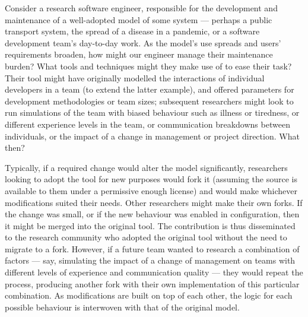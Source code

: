 







Consider a research software engineer, responsible for the development and
maintenance of a well-adopted model of some \sociotechnical system --- perhaps a
public transport system, the spread of a disease in a pandemic, or a software
development team's day-to-day work. As the model's use spreads and users'
requirements broaden, how might our engineer manage their maintenance burden?
What tools and techniques might they make use of to ease their task? Their tool
might have originally modelled the interactions of individual developers in a
team (to extend the latter example), and offered parameters for development
methodologies or team sizes; subsequent researchers might look to run
simulations of the team with biased behaviour such as illness or tiredness, or
different experience levels in the team, or communication breakdowns between
individuals, or the impact of a change in management or project direction. What
then?

Typically, if a required change would alter the model significantly, researchers
looking to adopt the tool for new purposes would fork it (assuming the source is
available to them under a permissive enough license) and would make whichever
modifications suited their needs. Other researchers might make their own forks.
If the change was small, or if the new behaviour was enabled in configuration,
then it might be merged into the original tool. The contribution is thus
disseminated to the research community who adopted the original tool without the
need to migrate to a fork. However, if a future team wanted to research a
combination of factors --- say, simulating the impact of a change of management
on teams with different levels of experience and communication quality --- they
would repeat the process, producing another fork with their own implementation
of this particular combination. As modifications are built on top of each other,
the logic for each possible behaviour is interwoven with that of the original
model.

